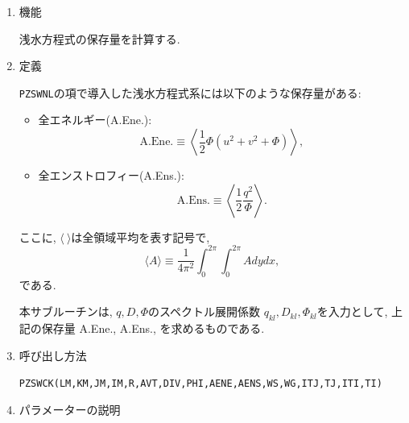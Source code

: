 \documentclass[a4j,fleqn]{jarticle}
\begin{document}
\begin{enumerate}

\item 機能

浅水方程式の保存量を計算する.

\item 定義

{\tt PZSWNL}の項で導入した浅水方程式系には以下のような保存量がある:
\begin{itemize}
\item 全エネルギー(A.Ene.):
\begin{equation}
\mbox{A.Ene.}\equiv\left\langle\frac12\Phi(u^2+v^2+\Phi)\right\rangle,
\end{equation}
\item 全エンストロフィー(A.Ens.):
\begin{equation}
\mbox{A.Ens.}\equiv\left\langle\frac12\frac{q^2}{\Phi}\right\rangle.
\end{equation}
\end{itemize}
ここに, $\langle\ \rangle$は全領域平均を表す記号で,
\begin{equation}
\langle A\rangle\equiv\frac1{4\pi^2}\int^{2\pi}_0\int^{2\pi}_0 A dy dx,
\end{equation}
である.

本サブルーチンは, $q,D,\Phi$のスペクトル展開係数
$q_{kl},D_{kl},\Phi_{kl}$を入力として, 
上記の保存量 A.Ene., A.Ens.,
を求めるものである.

\item 呼び出し方法 

{\tt PZSWCK(LM,KM,JM,IM,R,AVT,DIV,PHI,AENE,AENS,WS,WG,ITJ,TJ,ITI,TI)}
  
\item パラメーターの説明


\end{enumerate}
\end{document}

